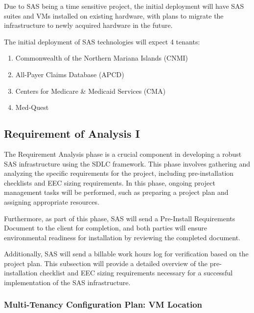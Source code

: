 Due to SAS being a time sensitive project, the initial deployment will have SAS suites and VMs installed on existing hardware, with plans to migrate the infrastructure to newly acquired hardware in the future.

The initial deployment of SAS technologies will expect 4 tenants:
\begin{enumerate}
    \item Commonwealth of the Northern Mariana Islands (CNMI)
    \item All-Payer Claims Database (APCD)
    \item Centers for Medicare \& Medicaid Services (CMA)
    \item Med-Quest
\end{enumerate}

\subsection{Requirement of Analysis I}

The Requirement Analysis phase is a crucial component in developing a robust SAS infrastructure using the SDLC framework. This phase involves gathering and analyzing the specific requirements for the project, including pre-installation checklists and EEC sizing requirements. In this phase, ongoing project management tasks will be performed, such as preparing a project plan and assigning appropriate resources. 

Furthermore, as part of this phase, SAS will send a Pre-Install Requirements Document to the client for completion, and both parties will ensure environmental readiness for installation by reviewing the completed document. 

Additionally, SAS will send a billable work hours log for verification based on the project plan. This subsection will provide a detailed overview of the pre-installation checklist and EEC sizing requirements necessary for a successful implementation of the SAS infrastructure.

\newpage 

\subsubsection{Multi-Tenancy Configuration Plan: VM Location}

